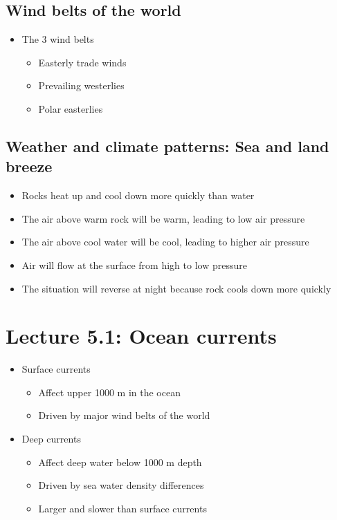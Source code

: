 \subsection{Wind belts of the world}

\begin{itemize}
    \item The 3 wind belts
    \begin{itemize}
        \item Easterly trade winds
        \item Prevailing westerlies
        \item Polar easterlies
    \end{itemize}
\end{itemize}

\subsection{Weather and climate patterns: Sea and land breeze}

\begin{itemize}
    \item Rocks heat up and cool down more quickly than water
    \item The air above warm rock will be warm, leading to low air pressure
    \item The air above cool water will be cool, leading to higher air pressure
    \item Air will flow at the surface from high to low pressure
    \item The situation will reverse at night because rock cools down more
        quickly
\end{itemize}

\section{Lecture 5.1: Ocean currents}

\begin{itemize}
    \item Surface currents
        \begin{itemize}
            \item Affect upper 1000 m in the ocean
            \item Driven by major wind belts of the world
        \end{itemize}
    \item Deep currents
        \begin{itemize}
            \item Affect deep water below 1000 m depth
            \item Driven by sea water density differences
            \item Larger and slower than surface currents
        \end{itemize}
\end{itemize}

